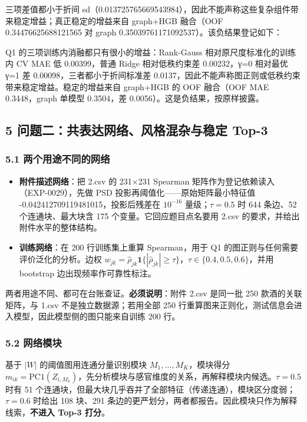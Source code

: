 \documentclass[
  11pt,
]{article}
\providecommand{\tightlist}{%
  \setlength{\itemsep}{0pt}\setlength{\parskip}{0pt}}
\begin{document}
三项差值都小于折间
sd（0.013725765669543984），因此不能声称这些复杂组件带来稳定增益；真正稳定的增益来自
graph+HGB 融合（OOF 0.34476625688121565 对 graph
0.35039761171092537）。该负结果登记如下：

Q1 的三项训练内消融都只有很小的增益：Rank-Gauss 相对原尺度标准化的训练内
CV MAE 低 0.00399，普通 Ridge 相对低秩约束差 0.00232，γ=0 相对最优 γ=1
差 0.00098，三者都小于折间标准差
0.0137，因此不能声称图正则或低秩约束带来稳定增益。稳定的增益来自
graph+HGB 的 OOF 融合（OOF MAE 0.3448，graph 单模型 0.3504，差
0.0056）。这是负结果，按原样披露。

\subsection{5 问题二：共表达网络、风格混杂与稳定
Top-3}\label{ux95eeux9898ux4e8cux5171ux8868ux8fbeux7f51ux7edcux98ceux683cux6df7ux6742ux4e0eux7a33ux5b9a-top-3}

\subsubsection{5.1
两个用途不同的网络}\label{ux4e24ux4e2aux7528ux9014ux4e0dux540cux7684ux7f51ux7edc}

\begin{itemize}
\tightlist
\item
  \textbf{附件描述网络}：把 2.csv 的 231×231 Spearman
  矩阵作为登记依赖读入（EXP-0029），先做 PSD
  投影再阈值化------原始矩阵最小特征值
  -0.042412709119481015，投影后残差在 \(10^{-16}\) 量级；\(\tau=0.5\) 时
  644 条边、52 个连通块、最大块含 175 个变量。它回应题目点名要用 2.csv
  的要求，并给出附件水平的整体结构。
\item
  \textbf{训练网络}：在 200 行训练集上重算 Spearman，用于 Q1
  的图正则与任何需要评价泛化的分析。边权
  \(w_{jk}=\hat\rho_{jk}\mathbf 1\{|\hat\rho_{jk}|\ge\tau\}\)，\(\tau\in\{0.4,0.5,0.6\}\)，并用
  bootstrap 边出现频率作可靠性标注。
\end{itemize}

两者用途不同、都可在台账查证。\textbf{必须说明}：附件 2.csv 是同一批 250
款酒的关联矩阵，与 1.csv 不是独立数据源；若用全部 250
行重算图来正则化，测试信息会进入模型，因此模型侧的图只能来自训练 200
行。

\subsubsection{5.2 网络模块}\label{ux7f51ux7edcux6a21ux5757}

基于 \(|W|\) 的阈值图用连通分量识别模块 \(M_1,\dots,M_K\)，模块得分
\(m_{ik}=\mathrm{PC1}(Z_{i,M_k})\)，先分析模块与感官维度的关系，再解释模块内候选。\(\tau=0.5\)
时有 51
个连通块，但最大块几乎吞并了全部特征（传递连通），模块区分度弱；\(\tau=0.6\)
时给出 108 块、291
条边的更严划分，两者都报告。因此模块只作为解释线索，\textbf{不进入 Top-3
打分}。
\end{document}
